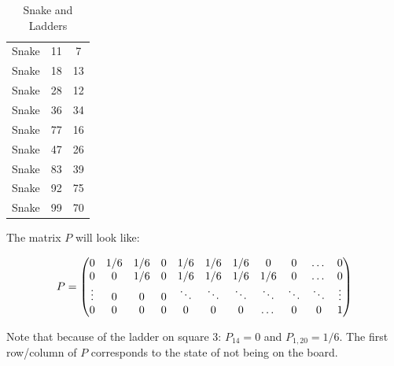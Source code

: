 \begin{table}[!hbtp]
\begin{tabular}{l|c|c}
Snake
&

11
&

7
\\

Snake
&

18
&

13
\\

Snake
&

28
&

12
\\

Snake
&

36
&

34
\\

Snake
&

77
&

16
\\

Snake
&

47
&

26
\\

Snake
&

83
&

39
\\

Snake
&

92
&

75
\\

Snake
&

99
&

70
\end{tabular}
\caption{Snake and Ladders}
\label{tbl:snakes_and_ladders}
\end{table}


The matrix \(P\) will look like:


\[
    P = \left(\begin{array}{@{}*{11}{c}@{}}
0      & 1/6 & 1/6 & 0 & 1/6    & 1/6    & 1/6    & 0      & 0      & \dots  & 0\\
0      & 0   & 1/6 & 0 & 1/6    & 1/6    & 1/6    & 1/6    & 0      & \dots  & 0\\
\vdots & 0   & 0   & 0 & \ddots & \ddots & \ddots & \ddots & \ddots & \ddots & \vdots\\
0      & 0   & 0   & 0 & 0      & 0      & 0      & \dots  & 0      & 0      & 1
\end{array}\right)
\]

Note that because of the ladder on square 3: \(P_{14}=0\) and \(P_{1, 20}=1/6\). The
first row/column of \(P\) corresponds to the state of not being on the board.


